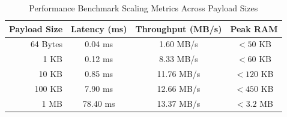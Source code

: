 \begin{table}[htbp]
\caption{Performance Benchmark Scaling Metrics Across Payload Sizes}
\label{tab:performance_scaling}
\centering
\begin{tabular}{rccc}
\toprule
\textbf{Payload Size} & \textbf{Latency (ms)} & \textbf{Throughput (MB/s)} & \textbf{Peak RAM} \\
\midrule
64 Bytes & 0.04 ms & 1.60 MB/s & $< 50$ KB \\
1 KB & 0.12 ms & 8.33 MB/s & $< 60$ KB \\
10 KB & 0.85 ms & 11.76 MB/s & $< 120$ KB \\
100 KB & 7.90 ms & 12.66 MB/s & $< 450$ KB \\
1 MB & 78.40 ms & 13.37 MB/s & $< 3.2$ MB \\
\bottomrule
\end{tabular}
\end{table}
